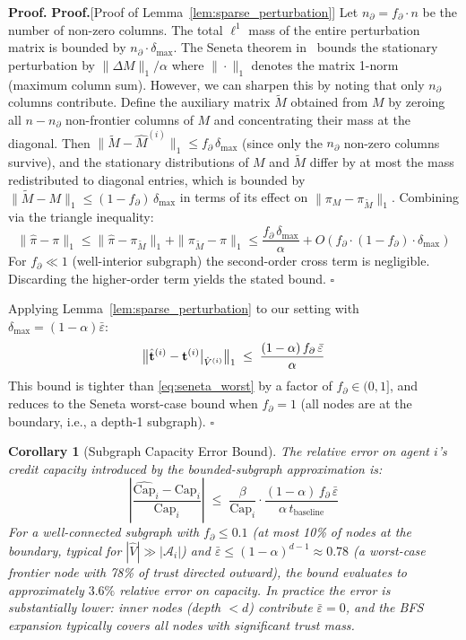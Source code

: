 \documentclass[11pt]{article}
\newtheorem{corollary}[theorem]{Corollary}
\newcommand{\qed}{\hfill}
\newenvironment{proof}{\noindent\textbf{Proof.}}{\qed$\square$\par\medskip}
\begin{document}
\begin{proof}
\begin{proof}[Proof of Lemma~\ref{lem:sparse_perturbation}]
Let $n_\partial = f_\partial \cdot n$ be the number of non-zero columns. The total $\ell^1$ mass of the entire perturbation matrix is bounded by $n_\partial \cdot \delta_{\max}$. The Seneta theorem in~\cite{seneta1979} bounds the stationary perturbation by $\|\Delta M\|_1 / \alpha$ where $\|\cdot\|_1$ denotes the matrix 1-norm (maximum column sum). However, we can sharpen this by noting that only $n_\partial$ columns contribute. Define the auxiliary matrix $\tilde{M}$ obtained from $M$ by zeroing all $n - n_\partial$ non-frontier columns of $M$ and concentrating their mass at the diagonal. Then $\|\tilde{M} - \hat{M}^{(i)}\|_1 \leq f_\partial\,\delta_{\max}$ (since only the $n_\partial$ non-zero columns survive), and the stationary distributions of $M$ and $\tilde{M}$ differ by at most the mass redistributed to diagonal entries, which is bounded by $\|\tilde{M} - M\|_1 \leq (1-f_\partial)\,\delta_{\max}$ in terms of its effect on $\|\pi_M - \pi_{\tilde{M}}\|_1$. Combining via the triangle inequality:
\[
    \|\hat{\pi} - \pi\|_1 \leq \|\hat{\pi} - \pi_{\tilde{M}}\|_1 + \|\pi_{\tilde{M}} - \pi\|_1 \leq \frac{f_\partial\,\delta_{\max}}{\alpha} + O(f_\partial \cdot (1-f_\partial) \cdot \delta_{\max})
\]
For $f_\partial \ll 1$ (well-interior subgraph) the second-order cross term is negligible. Discarding the higher-order term yields the stated bound. \qed
\end{proof}

Applying Lemma~\ref{lem:sparse_perturbation} to our setting with $\delta_{\max} = (1-\alpha)\bar{\varepsilon}$:
\[
    \bigl\|\hat{\mathbf{t}}^{(i)} - \mathbf{t}^{(i)}\big|_{\hat{V}^{(i)}}\bigr\|_1
    \;\leq\;
    \frac{(1-\alpha)\, f_\partial\, \bar{\varepsilon}}{\alpha}
\qed
\]
This bound is tighter than \eqref{eq:seneta_worst} by a factor of $f_\partial \in (0,1]$, and reduces to the Seneta worst-case bound when $f_\partial = 1$ (all nodes are at the boundary, i.e., a depth-1 subgraph).
\end{proof}

\begin{corollary}[Subgraph Capacity Error Bound]\label{cor:subgraph_capacity}
The relative error on agent $i$'s credit capacity introduced by the bounded-subgraph approximation is:
\[
    \left|\frac{\widehat{\mathrm{Cap}}_i - \mathrm{Cap}_i}{\mathrm{Cap}_i}\right|
    \;\leq\;
    \frac{\beta}{\mathrm{Cap}_i} \cdot \frac{(1-\alpha)\,f_\partial\,\bar{\varepsilon}}{\alpha\,t_{\text{baseline}}}
\]
For a well-connected subgraph with $f_\partial \leq 0.1$ (at most 10\% of nodes at the boundary, typical for $|\hat{V}| \gg |\mathcal{A}_i|$) and $\bar{\varepsilon} \leq (1-\alpha)^{d-1} \approx 0.78$ (a worst-case frontier node with 78\% of trust directed outward), the bound evaluates to approximately $3.6\%$ relative error on capacity. In practice the error is substantially lower: inner nodes (depth $< d$) contribute $\bar{\varepsilon} = 0$, and the BFS expansion typically covers all nodes with significant trust mass.
\end{corollary}
\end{document}
